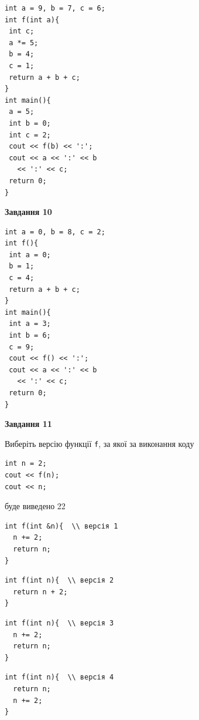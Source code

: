 \documentclass[12pt, ukrainian]{article}
\def\code#1{\Verb!#1!}
\begin{document}
{\begin {large}
\begin{minipage}[t]{7.0cm}
\begin{verbatim}
int a = 9, b = 7, c = 6;
int f(int a){
 int c;
 a *= 5;
 b = 4;
 c = 1;
 return a + b + c;
}
int main(){
 a = 5;
 int b = 0;
 int c = 2;
 cout << f(b) << ':';
 cout << a << ':' << b 
   << ':' << c;
 return 0;
}
\end{verbatim}



\begin{center}
\textbf{Завдання 10}
\end{center}
\vspace{-8mm}

\begin{verbatim}
int a = 0, b = 8, c = 2;
int f(){
 int a = 0;
 b = 1;
 c = 4;
 return a + b + c;
}
int main(){
 int a = 3;
 int b = 6;
 c = 9;
 cout << f() << ':';
 cout << a << ':' << b 
   << ':' << c;
 return 0;
}
\end{verbatim}

\end{minipage}
\vline \hspace{1mm}
\begin{minipage}[t]{11.0cm}

\begin{center}
\textbf{Завдання 11}
\end{center}
Виберіть версію функції \code{f}, за якої за виконання коду
\begin{verbatim}
int n = 2;
cout << f(n);
cout << n;
\end{verbatim}

буде виведено 22

\begin{verbatim}
int f(int &n){  \\ версія 1
  n += 2;
  return n;
}
\end{verbatim}

\vspace{-8mm}\begin{verbatim}
int f(int n){  \\ версія 2
  return n + 2;
}
\end{verbatim}

\vspace{-8mm}\begin{verbatim}
int f(int n){  \\ версія 3
  n += 2;
  return n;
}
\end{verbatim}

\vspace{-8mm}\begin{verbatim}
int f(int n){  \\ версія 4
  return n;
  n += 2;
}
\end{verbatim}




\end{minipage}
\end{large}}
\end{document}
